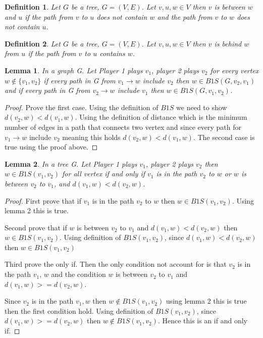 \documentclass{article}
\newtheorem{lemma}{Lemma}
\newtheorem{definition}{Definition}
\begin{document}
\begin{definition}
Let \(G\) be a tree, \(G=(V,E)\). Let \( v,u,w \in V \) then \(v\) is between \(w\) and \(u\) if the path from \(v\) to \(u\) does not contain \(w\) and  the path from \(v\) to \(w\) does not contain \(u\).
\end{definition}

\begin{definition}
Let \(G\) be a tree, \(G=(V,E)\). Let \( v,u,w \in V \) then \(v\) is behind \(w\) from \(u\) if the path from \(v\) to \(u\) contains \(w\).
\end{definition}


\begin{lemma}
In a graph G. Let Player 1 plays \( v_1 \), player 2 plays  \( v_2 \) for every vertex \( w \notin  \{v_1,v_2\} \) if every path in G from \( v_1 \to w\) include \( v_2 \) then \( w \in B1S(G,v_2,v_1)\) and  if every path in G from \( v_2 \to w\) include \( v_1 \) then \( w \in B1S(G,v_1,v_2)\).
\end{lemma}

\begin{proof}
Prove the first case. Using the definition of \(B1S\) we need to show  \(d(v_2, w) < d(v_1, w)\). Using the definition of distance which is the minimum number of edges in a path that connects two vertex and since every path for \( v_1 \to w\) include \( v_2 \) meaning this holds \(d(v_2, w) < d(v_1, w)\). The second case is true using the proof above.
\end{proof}

\begin{lemma}
In a tree G. Let Player 1 plays \( v_1 \), player 2 plays  \( v_2 \) then \( w \in  B1S(v_1, v_2) \) for all vertex if and only if \( v_1 \) is in the path \(v_2\) to \( w \)  or \( w \) is between \(v_2\) to \(v_1\), and \(d(v_1,w)<d(v_2,w)\).
\end{lemma}

\begin{proof}
First prove that if \( v_1 \) is in the path \(v_2\) to \( w \) then \( w \in  B1S(v_1, v_2) \). Using lemma 2 this is true.

Second prove that if  \( w \) is between \(v_2\) to \(v_1\) and \(d(v_1,w)<d(v_2,w)\) then \( w \in  B1S(v_1, v_2) \). Using definition of \(B1S(v_1, v_2) \), since \(d(v_1,w)<d(v_2,w)\) then \( w \in  B1S(v_1, v_2) \)

Third prove the only if. Then the only condition not account for is that \( v_2 \) is in the path \(v_1 \), \( w\) and the condition  \( w \) is between \(v_2\) to \(v_1\) and \(d(v_1,w)>=d(v_2,w)\). 

Since \( v_2 \) is in the path \(v_1, w\) then \( w \notin  B1S(v_1, v_2) \) using lemma 2 this is true then the first condition hold. Using definition of \(B1S(v_1, v_2) \), since \(d(v_1,w)>=d(v_2,w)\) then \( w \notin  B1S(v_1, v_2) \). Hence this is an if and only if.

\end{proof}
\end{document}
